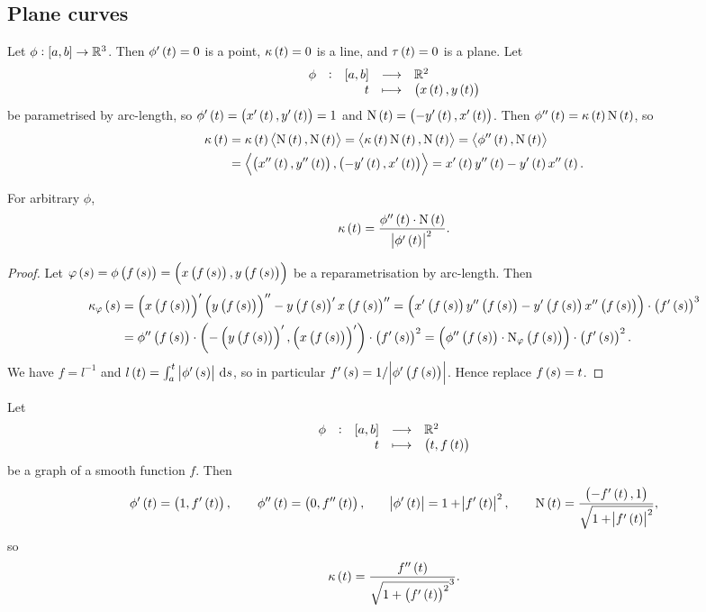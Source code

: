 \pagebreak

\subsection{Plane curves}

Let $ \phi : \sbr{a, b} \to \RR^3 $. Then $ \phi'\br{t} = 0 $ is a point, $ \kappa\br{t} = 0 $ is a line, and $ \tau\br{t} = 0 $ is a plane. Let
$$ \function[\phi]{\sbr{a, b}}{\RR^2}{t}{\br{x\br{t}, y\br{t}}} $$
be parametrised by arc-length, so $ \phi'\br{t} = \br{x'\br{t}, y'\br{t}} = 1 $ and $ \N\br{t} = \br{-y'\br{t}, x'\br{t}} $. Then $ \phi''\br{t} = \kappa\br{t}\N\br{t} $, so
\begin{align*}
\kappa\br{t}
& = \kappa\br{t}\abr{\N\br{t}, \N\br{t}}
= \abr{\kappa\br{t}\N\br{t}, \N\br{t}}
= \abr{\phi''\br{t}, \N\br{t}} \\
& = \abr{\br{x''\br{t}, y''\br{t}}, \br{-y'\br{t}, x'\br{t}}}
= x'\br{t}y''\br{t} - y'\br{t}x''\br{t}.
\end{align*}

\begin{proposition}
For arbitrary $ \phi $,
$$ \kappa\br{t} = \dfrac{\phi''\br{t} \cdot \N\br{t}}{\abs{\phi'\br{t}}^2}. $$
\end{proposition}

\begin{proof}
Let $ \varphi\br{s} = \phi\br{f\br{s}} = \br{x\br{f\br{s}}, y\br{f\br{s}}} $ be a reparametrisation by arc-length. Then
\begin{align*}
\kappa_\varphi\br{s}
& = \br{x\br{f\br{s}}}'\br{y\br{f\br{s}}}'' - y\br{f\br{s}}'x\br{f\br{s}}''
= \br{x'\br{f\br{s}}y''\br{f\br{s}} - y'\br{f\br{s}}x''\br{f\br{s}}} \cdot \br{f'\br{s}}^3 \\
& = \phi''\br{f\br{s}} \cdot \br{-\br{y\br{f\br{s}}}', \br{x\br{f\br{s}}}'} \cdot \br{f'\br{s}}^2
= \br{\phi''\br{f\br{s}} \cdot \N_\varphi\br{f\br{s}}} \cdot \br{f'\br{s}}^2.
\end{align*}
We have $ f = l^{-1} $ and $ l\br{t} = \intd{a}{t}{\abs{\phi'\br{s}}}{s} $, so in particular $ f'\br{s} = 1 / \abs{\phi'\br{f\br{s}}} $. Hence replace $ f\br{s} = t $.
\end{proof}

\begin{example*}
Let
$$ \function[\phi]{\sbr{a, b}}{\RR^2}{t}{\br{t, f\br{t}}} $$
be a graph of a smooth function $ f $. Then
$$ \phi'\br{t} = \br{1, f'\br{t}}, \qquad \phi''\br{t} = \br{0, f''\br{t}}, \qquad \abs{\phi'\br{t}} = 1 + \abs{f'\br{t}}^2, \qquad \N\br{t} = \dfrac{\br{-f'\br{t}, 1}}{\sqrt{1 + \abs{f'\br{t}}^2}}, $$
so
$$ \kappa\br{t} = \dfrac{f''\br{t}}{\sqrt{1 + \br{f'\br{t}}^2}^3}. $$
\end{example*}

